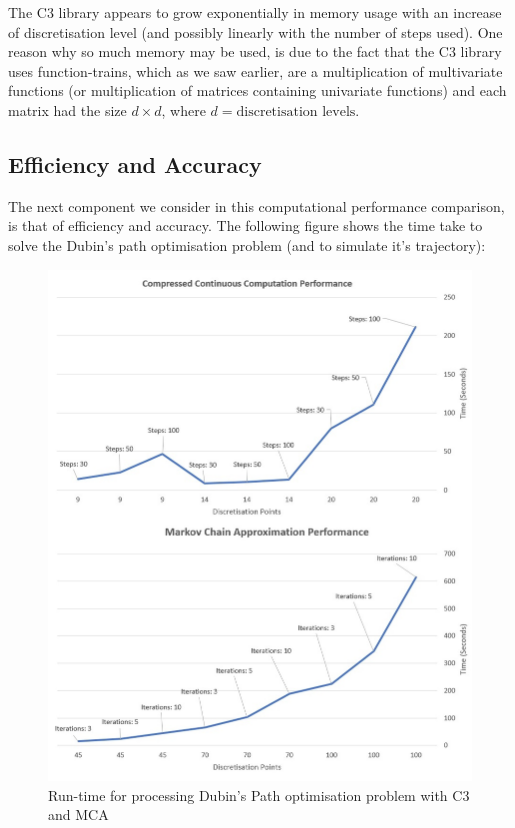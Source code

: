 \documentclass[11pt,draftd]{article}
\begin{document}
The C3 library appears to grow exponentially in memory usage with an increase of discretisation level (and possibly linearly with the number of steps used). One reason why so much memory may be used, is due to the fact that the C3 library uses function-trains, which as we saw earlier, are a multiplication of multivariate functions (or multiplication of matrices containing univariate functions) and each matrix had the size $ d\times d $, where $ d = \text{discretisation levels} $.

\newpage

\subsection{Efficiency and Accuracy}
The next component we consider in this computational performance comparison, is that of efficiency and accuracy. The following figure shows the time take to solve the Dubin's path optimisation problem (and to simulate it's trajectory):

\begin{figure}[H]
	\centering
	\includegraphics[scale=0.47]{images/c3Performance.jpg}
	\caption{Run-time for processing Dubin's Path optimisation problem with C3 and MCA}
\end{figure}
\end{document}
